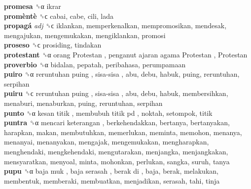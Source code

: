 \textbf{promesa} ␝α  ikrar  \\
\textbf{promèntè} ␝ϲ  cabai, cabe, cili, lada  \\
\textbf{propagá} \emph{adj}  ␝ϲ  iklankan, memperkenalkan, mempromosikan, mendesak, mengajukan, mengemukakan, mengiklankan, promosi  \\
\textbf{proseso} ␝ϲ  prosiding, tindakan  \\
\textbf{protestant} ␝α   orang Protestan ,  penganut ajaran agama Protestan ,  Protestan   \\
\textbf{proverbio} ␝α  bidalan, pepatah, peribahasa, perumpamaan  \\
\textbf{puiro} ␝α   reruntuhan puing ,  sisa-sisa , abu, debu, habuk, puing, reruntuhan, serpihan  \\
\textbf{puiru} ␝ϲ   reruntuhan puing ,  sisa-sisa , abu, debu, habuk, membersihkan, menaburi, menaburkan, puing, reruntuhan, serpihan  \\
\textbf{punto} ␝α   kesan titik ,  membubuh titik pd , noktah, setompok, titik  \\
\textbf{puntra} ␝α   mencari keterangan , berkehendakkan, bertanya, bertanyakan, harapkan, makan, membutuhkan, memerlukan, meminta, memohon, menanya, menanyai, menanyakan, mengajak, mengemukakan, mengharapkan, menghendaki, mengkehendaki, mengutarakan, menjangka, menjangkakan, mensyaratkan, menyoal, minta, mohonkan, perlukan, sangka, suruh, tanya  \\
\textbf{pupu} ␝α   baja muk ,  baja serasah ,  berak di , baja, berak, melakukan, membentuk, memberaki, membuatkan, menjadikan, serasah, tahi, tinja  \\
